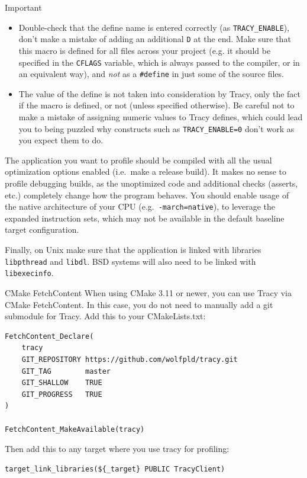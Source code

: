 \documentclass[hidelinks,titlepage,a4paper]{article}
\begin{document}
\begin{bclogo}[
noborder=true,
couleur=black!5,
logo=\bcbombe
]{Important}
\begin{itemize}
\item Double-check that the define name is entered correctly (as \texttt{TRACY\_ENABLE}), don't make a mistake of adding an additional \texttt{D} at the end. Make sure that this macro is defined for all files across your project (e.g. it should be specified in the \texttt{CFLAGS} variable, which is always passed to the compiler, or in an equivalent way), and \emph{not} as a \texttt{\#define} in just some of the source files.
\item The value of the define is not taken into consideration by Tracy, only the fact if the macro is defined, or not (unless specified otherwise). Be careful not to make a mistake of assigning numeric values to Tracy defines, which could lead you to being puzzled why constructs such as \texttt{TRACY\_ENABLE=0} don't work as you expect them to do.
\end{itemize}
\end{bclogo}

The application you want to profile should be compiled with all the usual optimization options enabled (i.e.~make a release build). It makes no sense to profile debugging builds, as the unoptimized code and additional checks (asserts, etc.) completely change how the program behaves. You should enable usage of the native architecture of your CPU (e.g.~\texttt{-march=native}), to leverage the expanded instruction sets, which may not be available in the default baseline target configuration.

Finally, on Unix make sure that the application is linked with libraries \texttt{libpthread} and \texttt{libdl}. BSD systems will also need to be linked with \texttt{libexecinfo}.


\begin{bclogo}[
noborder=true,
couleur=black!5,
logo=\bclampe
]{CMake FetchContent}
When using CMake 3.11 or newer, you can use Tracy via CMake FetchContent. In this case, you do not need to manually add a git submodule for Tracy. Add this to your CMakeLists.txt:

\begin{lstlisting}
FetchContent_Declare(
    tracy
    GIT_REPOSITORY https://github.com/wolfpld/tracy.git
    GIT_TAG        master
    GIT_SHALLOW    TRUE
    GIT_PROGRESS   TRUE
)

FetchContent_MakeAvailable(tracy)
\end{lstlisting}

Then add this to any target where you use tracy for profiling:

\begin{lstlisting}
target_link_libraries(${_target} PUBLIC TracyClient)
\end{lstlisting}
\end{bclogo}
\end{document}
